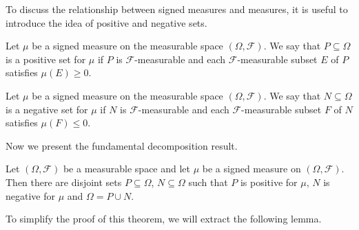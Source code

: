 To discuss the relationship between signed measures and measures, it is useful to introduce the idea of positive and negative sets.
\begin{definition}
Let $\mu$ be a signed measure on the measurable space $(\Omega, \mathcal{F})$. We say that $P \subseteq \Omega$ is a positive set for $\mu$ if $P$ is $\mathcal{F}$-measurable and each $\mathcal{F}$-measurable subset $E$ of $P$ satisfies $\mu(E) \geq 0$.
\end{definition}
\begin{definition}
Let $\mu$ be a signed measure on the measurable space $(\Omega, \mathcal{F})$. We say that $N \subseteq \Omega$ is a negative set for $\mu$ if $N$ is $\mathcal{F}$-measurable and each $\mathcal{F}$-measurable subset $F$ of $N$ satisfies $\mu(F) \leq 0$.
\end{definition}
Now we present the fundamental decomposition result.
\begin{theorem}
\label{thm:hahn-decomp-thm}
Let $(\Omega, \mathcal{F})$ be a measurable space and let $\mu$ be a signed measure on $(\Omega, \mathcal{F})$. Then there are disjoint sets $P \subseteq \Omega$, $N \subseteq \Omega$ such that $P$ is positive for $\mu$, $N$ is negative for $\mu$ and $\Omega = P \cup N$. 
\end{theorem}
To simplify the proof of this theorem, we will extract the following lemma.
